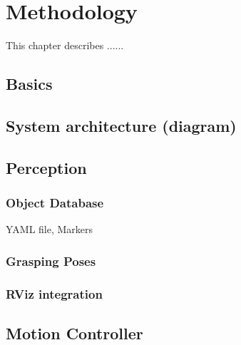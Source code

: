 
\chapter{Methodology}

This chapter describes ......

\section{Basics}


\section{System architecture (diagram)}
\section{Perception}
\subsection{Object Database}
YAML file, Markers
\subsection{Grasping Poses}
\subsection{RViz integration}

\section{Motion Controller}


